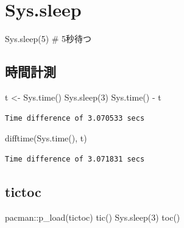 \documentclass[
  letterpaper,
  DIV=11,
  numbers=noendperiod]{scrreprt}
\newenvironment{Shaded}{\begin{snugshade}}{\end{snugshade}}
\newcommand{\CommentTok}[1]{\textcolor[rgb]{0.37,0.37,0.37}{#1}}
\newcommand{\DecValTok}[1]{\textcolor[rgb]{0.68,0.00,0.00}{#1}}
\newcommand{\FunctionTok}[1]{\textcolor[rgb]{0.28,0.35,0.67}{#1}}
\newcommand{\NormalTok}[1]{\textcolor[rgb]{0.00,0.23,0.31}{#1}}
\newcommand{\OtherTok}[1]{\textcolor[rgb]{0.00,0.23,0.31}{#1}}
\newcommand{\SpecialCharTok}[1]{\textcolor[rgb]{0.37,0.37,0.37}{#1}}
\begin{document}
\hypertarget{sys.sleep}{%
\section{Sys.sleep}\label{sys.sleep}}

\begin{Shaded}
\begin{Highlighting}[]
\FunctionTok{Sys.sleep}\NormalTok{(}\DecValTok{5}\NormalTok{) }\CommentTok{\# 5秒待つ}
\end{Highlighting}
\end{Shaded}

\hypertarget{ux6642ux9593ux8a08ux6e2c}{%
\subsection{時間計測}\label{ux6642ux9593ux8a08ux6e2c}}

\begin{Shaded}
\begin{Highlighting}[]
\NormalTok{t }\OtherTok{\textless{}{-}} \FunctionTok{Sys.time}\NormalTok{()}
\FunctionTok{Sys.sleep}\NormalTok{(}\DecValTok{3}\NormalTok{)}
\FunctionTok{Sys.time}\NormalTok{() }\SpecialCharTok{{-}}\NormalTok{ t}
\end{Highlighting}
\end{Shaded}

\begin{verbatim}
Time difference of 3.070533 secs
\end{verbatim}

\begin{Shaded}
\begin{Highlighting}[]
\FunctionTok{difftime}\NormalTok{(}\FunctionTok{Sys.time}\NormalTok{(), t)}
\end{Highlighting}
\end{Shaded}

\begin{verbatim}
Time difference of 3.071831 secs
\end{verbatim}

\hypertarget{tictoc}{%
\subsection{tictoc}\label{tictoc}}

\begin{Shaded}
\begin{Highlighting}[]
\NormalTok{pacman}\SpecialCharTok{::}\FunctionTok{p\_load}\NormalTok{(tictoc)}
\FunctionTok{tic}\NormalTok{()}
\FunctionTok{Sys.sleep}\NormalTok{(}\DecValTok{3}\NormalTok{)}
\FunctionTok{toc}\NormalTok{()}
\end{Highlighting}
\end{Shaded}
\end{document}
